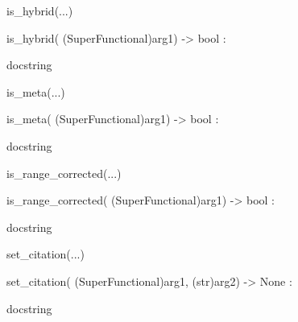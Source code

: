 \documentclass[letterpaper,10pt,english]{sphinxmanual}
\begin{document}
\begin{description}
\begin{description}
\begin{DUlineblock}{0em}
\begin{DUlineblock}{\DUlineblockindent}
\begin{DUlineblock}{\DUlineblockindent}
\item[] 
\end{DUlineblock}
\end{DUlineblock}
\item[] is\_hybrid(...)
\item[]
\begin{DUlineblock}{\DUlineblockindent}
\item[] is\_hybrid( (SuperFunctional)arg1) -\textgreater{} bool :
\item[]
\begin{DUlineblock}{\DUlineblockindent}
\item[] docstring
\item[] 
\end{DUlineblock}
\end{DUlineblock}
\item[] is\_meta(...)
\item[]
\begin{DUlineblock}{\DUlineblockindent}
\item[] is\_meta( (SuperFunctional)arg1) -\textgreater{} bool :
\item[]
\begin{DUlineblock}{\DUlineblockindent}
\item[] docstring
\item[] 
\end{DUlineblock}
\end{DUlineblock}
\item[] is\_range\_corrected(...)
\item[]
\begin{DUlineblock}{\DUlineblockindent}
\item[] is\_range\_corrected( (SuperFunctional)arg1) -\textgreater{} bool :
\item[]
\begin{DUlineblock}{\DUlineblockindent}
\item[] docstring
\item[] 
\end{DUlineblock}
\end{DUlineblock}
\item[] set\_citation(...)
\item[]
\begin{DUlineblock}{\DUlineblockindent}
\item[] set\_citation( (SuperFunctional)arg1, (str)arg2) -\textgreater{} None :
\item[]
\begin{DUlineblock}{\DUlineblockindent}
\item[] docstring

\end{DUlineblock}
\end{DUlineblock}
\end{DUlineblock}
\end{description}
\end{description}
\end{document}
